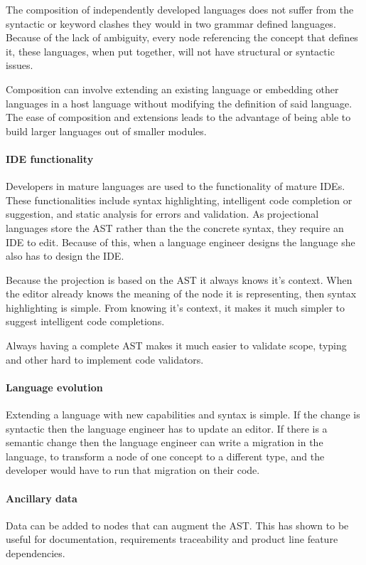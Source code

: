 The composition of independently developed languages does not suffer from the syntactic or keyword clashes they would in two grammar defined languages.
Because of the lack of ambiguity, every node referencing the concept that defines it, these languages, when put together, will not have structural or syntactic issues.

Composition can involve extending an existing language or embedding other languages in a host language without modifying the definition of said language.
The ease of composition and extensions leads to the advantage of being able to build larger languages out of smaller modules.

\paragraph{IDE functionality}
Developers in mature languages are used to the functionality of mature IDEs.
These functionalities include syntax highlighting, intelligent code completion or suggestion, and static analysis for errors and validation.
As projectional languages store the AST rather than the the concrete syntax, they require an IDE to edit.
Because of this, when a language engineer designs the language she also has to design the IDE.

Because the projection is based on the AST it always knows it's context.
When the editor already knows the meaning of the node it is representing, then syntax highlighting is simple.
From knowing it's context, it makes it much simpler to suggest intelligent code completions.

Always having a complete AST makes it much easier to validate scope, typing and other hard to implement code validators.

\paragraph{Language evolution}
Extending a language with new capabilities and syntax is simple.
If the change is syntactic then the language engineer has to update an editor.
If there is a semantic change then the language engineer can write a migration in the language, to transform a node of one concept to a different type, and the developer would have to run that migration on their code.

\paragraph{Ancillary data}
Data can be added to nodes that can augment the AST. 
This has shown to be useful for documentation, requirements traceability and product line feature dependencies.

